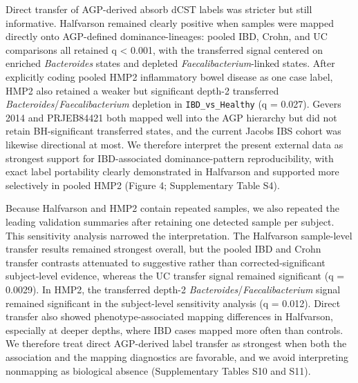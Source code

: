 \documentclass[
  11pt,
]{article}
\newcommand{\taxon}[1]{\emph{#1}}
\newcommand{\dcstsep}{/\allowbreak}
\begin{document}
Direct transfer of AGP-derived absorb dCST labels was stricter but still
informative. Halfvarson remained
clearly positive when samples were mapped directly onto AGP-defined
dominance-lineages: pooled IBD, Crohn, and UC comparisons all retained q < 0.001,
with the transferred signal centered on enriched \taxon{Bacteroides}
states and depleted \taxon{Faecalibacterium}-linked states. After
explicitly coding pooled HMP2 inflammatory bowel disease as one case
label, HMP2 also retained a weaker but significant depth-2 transferred
\taxon{Bacteroides}\dcstsep\taxon{Faecalibacterium} depletion in
\texttt{IBD\_vs\_Healthy} (q = 0.027). Gevers 2014 and PRJEB84421 both
mapped well into the AGP hierarchy but did not retain BH-significant
transferred states, and the current Jacobs IBS cohort was likewise
directional at most. We therefore interpret the present external data as
strongest support for IBD-associated dominance-pattern reproducibility,
with exact label portability clearly demonstrated in Halfvarson and
supported more selectively in pooled HMP2 (Figure 4; Supplementary Table
S4).

Because Halfvarson and HMP2 contain repeated samples, we also repeated
the leading validation summaries after retaining one detected sample per
subject. This sensitivity analysis narrowed the interpretation. The
Halfvarson sample-level transfer results remained strongest overall, but
the pooled IBD and Crohn transfer contrasts attenuated to suggestive
rather than corrected-significant subject-level evidence, whereas the UC
transfer signal remained significant (q = 0.0029). In HMP2, the
transferred depth-2 \taxon{Bacteroides}\dcstsep\taxon{Faecalibacterium}
signal remained significant in the subject-level sensitivity analysis
(q = 0.012). Direct transfer also showed phenotype-associated mapping
differences in Halfvarson, especially at deeper depths, where IBD cases
mapped more often than controls. We therefore treat direct AGP-derived
label transfer as strongest when both the association and the mapping
diagnostics are favorable, and we avoid interpreting nonmapping as
biological absence (Supplementary Tables S10 and S11).
\end{document}
